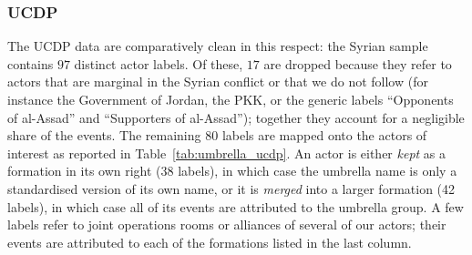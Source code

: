 \subsubsection*{UCDP}

The UCDP data are comparatively clean in this respect: the Syrian sample
contains $97$ distinct actor labels. Of these, $17$ are dropped because they
refer to actors that are marginal in the Syrian conflict or that we do not
follow (for instance the Government of Jordan, the PKK, or the generic labels
``Opponents of al-Assad'' and ``Supporters of al-Assad''); together they account
for a negligible share of the events. The remaining $80$ labels are mapped onto
the actors of interest as reported in Table~\ref{tab:umbrella_ucdp}. An actor is
either \emph{kept} as a formation in its own right (38 labels), in which case the
umbrella name is only a standardised version of its own name, or it is
\emph{merged} into a larger formation (42 labels), in which case all of its events
are attributed to the umbrella group. A few labels refer to joint operations
rooms or alliances of several of our actors; their events are attributed to each
of the formations listed in the last column.

